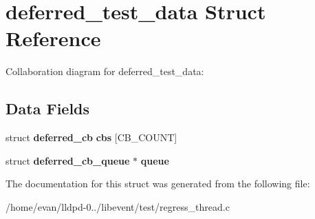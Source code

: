 \section{deferred\-\_\-test\-\_\-data \-Struct \-Reference}
\label{structdeferred__test__data}


\-Collaboration diagram for deferred\-\_\-test\-\_\-data\-:
\subsection*{\-Data \-Fields}
\begin{DoxyCompactItemize}
\item 
struct {\bf deferred\-\_\-cb} {\bfseries cbs} [\-C\-B\-\_\-\-C\-O\-U\-N\-T]\label{structdeferred__test__data_a60760a73a5ecc83f4b5057ddcde9ed50}

\item 
struct {\bf deferred\-\_\-cb\-\_\-queue} $\ast$ {\bfseries queue}\label{structdeferred__test__data_aa5a17d8e8bc5379fab1254fb7a745e10}

\end{DoxyCompactItemize}


\-The documentation for this struct was generated from the following file\-:\begin{DoxyCompactItemize}
\item 
/home/evan/lldpd-\/0../libevent/test/regress\-\_\-thread.\-c\end{DoxyCompactItemize}
